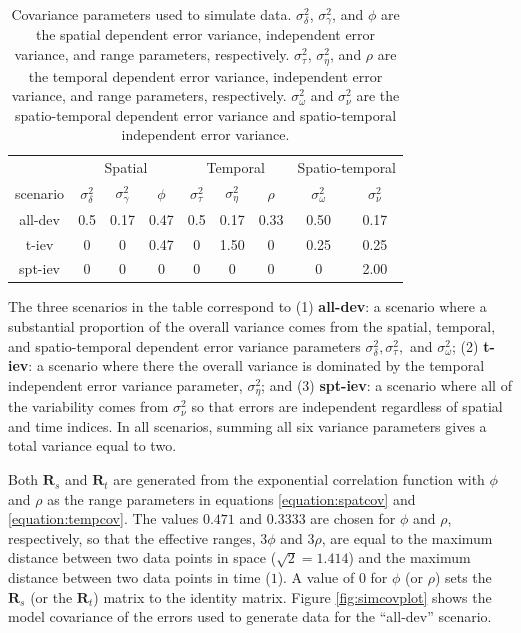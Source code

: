 \documentclass[]{interact}
\theoremstyle{plain}%
\theoremstyle{definition}
\theoremstyle{remark}
\begin{document}
\begin{table}[H]

\caption{\label{tab:simparmtab}Covariance parameters used to simulate data. $\sigma^2_{\delta}$, $\sigma^2_{\gamma}$, and $\phi$ are the spatial dependent error variance, independent error variance, and range parameters, respectively. $\sigma^2_{\tau}$, $\sigma^2_{\eta}$, and $\rho$ are the temporal dependent error variance, independent error variance, and range parameters, respectively. $\sigma^2_{\omega}$ and $\sigma^2_{\nu}$ are the spatio-temporal dependent error variance and spatio-temporal independent error variance.}
\centering
\begin{tabular}[t]{ccccccccc}
\toprule
\multicolumn{1}{c}{ } & \multicolumn{3}{c}{Spatial} & \multicolumn{3}{c}{Temporal} & \multicolumn{2}{c}{Spatio-temporal} \\
\cmidrule(l{3pt}r{3pt}){2-4} \cmidrule(l{3pt}r{3pt}){5-7} \cmidrule(l{3pt}r{3pt}){8-9}
scenario & $\sigma^2_{\delta}$ & $\sigma^2_{\gamma}$ & $\phi$ & $\sigma^2_{\tau}$ & $\sigma^2_{\eta}$ & $\rho$ & $\sigma^2_{\omega}$ & $\sigma^2_{\nu}$\\
\midrule
all-dev & 0.5 & 0.17 & 0.47 & 0.5 & 0.17 & 0.33 & 0.50 & 0.17\\
t-iev & 0 & 0 & 0.47 & 0 & 1.50 & 0 & 0.25 & 0.25\\
spt-iev & 0 & 0 & 0 & 0 & 0 & 0 & 0 & 2.00\\
\bottomrule
\end{tabular}
\end{table}

The three scenarios in the table correspond to (1) \textbf{all-dev}: a
scenario where a substantial proportion of the overall variance comes
from the spatial, temporal, and spatio-temporal dependent error variance
parameters \(\sigma^2_{\delta}, \sigma^2_{\tau},\) and
\(\sigma^2_{\omega}\); (2) \textbf{t-iev}: a scenario where there the
overall variance is dominated by the temporal independent error variance
parameter, \(\sigma^2_{\eta}\); and (3) \textbf{spt-iev}: a scenario
where all of the variability comes from \(\sigma^2_{\nu}\) so that
errors are independent regardless of spatial and time indices. In all
scenarios, summing all six variance parameters gives a total variance
equal to two.

Both \(\mathbf{R}_{s}\) and \(\mathbf{R}_t\) are generated from the
exponential correlation function with \(\phi\) and \(\rho\) as the range
parameters in equations \ref{equation:spatcov} and
\ref{equation:tempcov}. The values \(0.471\) and \(0.3333\) are chosen
for \(\phi\) and \(\rho\), respectively, so that the effective ranges,
\(3 \phi\) and \(3 \rho\), are equal to the maximum distance between two
data points in space (\(\sqrt2 = 1.414\)) and the maximum distance
between two data points in time (\(1\)). A value of 0 for \(\phi\) (or
\(\rho\)) sets the \(\mathbf{R}_{s}\) (or the \(\mathbf{R}_t\)) matrix
to the identity matrix. Figure \ref{fig:simcovplot} shows the model
covariance of the errors used to generate data for the ``all-dev''
scenario.
\end{document}
